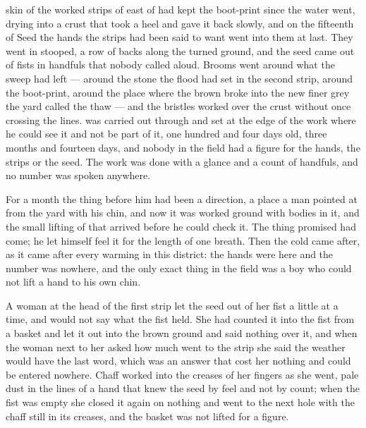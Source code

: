 
 skin of the worked strips of  east of  had kept the boot-print since the water went, drying into a crust that took a heel and gave it back slowly, and on the fifteenth of Seed the hands the strips had been said to want went into them at last. They went in stooped, a row of backs along the turned ground, and the seed came out of fists in handfuls that nobody called aloud. Brooms went around what the sweep had left --- around the stone the flood had set in the second strip, around the boot-print, around the place where the brown broke into the new finer grey the yard called the thaw --- and the bristles worked over the crust without once crossing the lines.  was carried out through  and set at the edge of the work where he could see it and not be part of it, one hundred and four days old, three months and fourteen days, and nobody in the field had a figure for the hands, the strips or the seed. The work was done with a glance and a count of handfuls, and no number was spoken anywhere.

For a month the thing before him had been a direction, a place a man pointed at from the yard with his chin, and now it was worked ground with bodies in it, and the small lifting of that arrived before he could check it. The thing promised had come; he let himself feel it for the length of one breath. Then the cold came after, as it came after every warming in this district: the hands were here and the number was nowhere, and the only exact thing in the field was a boy who could not lift a hand to his own chin.

\scenebreak

A woman at the head of the first strip let the seed out of her fist a little at a time, and would not say what the fist held. She had counted it into the fist from a basket and let it out into the brown ground and said nothing over it, and when the woman next to her asked how much went to the strip she said the weather would have the last word, which was an answer that cost her nothing and could be entered nowhere. Chaff worked into the creases of her fingers as she went, pale dust in the lines of a hand that knew the seed by feel and not by count; when the fist was empty she closed it again on nothing and went to the next hole with the chaff still in its creases, and the basket was not lifted for a figure.

